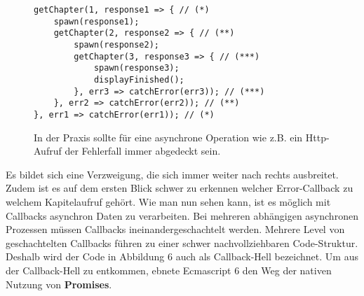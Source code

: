 \begin{figure}[H]
\begin{lstlisting}[basicstyle=\small]
getChapter(1, response1 => { // (*)
    spawn(response1);
    getChapter(2, response2 => { // (**)
        spawn(response2);
        getChapter(3, response3 => { // (***)
            spawn(response3);
            displayFinished();
        }, err3 => catchError(err3)); // (***)
    }, err2 => catchError(err2)); // (**)
}, err1 => catchError(err1)); // (*)
\end{lstlisting}
\caption{In der Praxis sollte für eine asynchrone Operation wie z.B. ein Http-Aufruf der Fehlerfall immer abgedeckt sein.}
\end{figure}

\noindent
Es bildet sich eine Verzweigung, die sich immer weiter nach rechts ausbreitet. Zudem ist es auf dem ersten Blick schwer zu erkennen welcher Error-Callback zu welchem Kapitelaufruf gehört. Wie man nun sehen kann, ist es möglich mit Callbacks asynchron Daten zu verarbeiten. Bei mehreren abhängigen asynchronen Prozessen müssen Callbacks ineinandergeschachtelt werden. Mehrere Level von geschachtelten Callbacks führen zu einer schwer nachvollziehbaren Code-Struktur. Deshalb wird der Code in Abbildung 6 auch als \glqq{}Callback-Hell\grqq{} bezeichnet. Um aus der Callback-Hell zu entkommen, ebnete Ecmascript 6 den Weg der nativen Nutzung von \textbf{Promises}.



